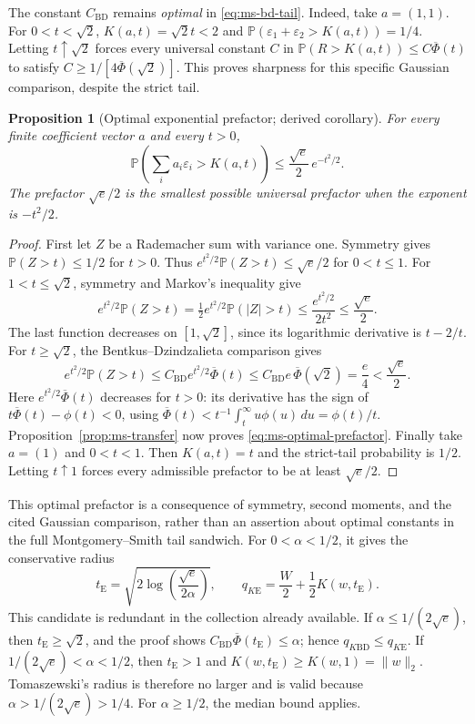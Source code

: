 \documentclass[11pt,letterpaper]{article}
\numberwithin{equation}{section}
\newtheorem{proposition}[theorem]{Proposition}
\theoremstyle{definition}
\theoremstyle{remark}
\begin{document}
The constant $C_{\mathrm{BD}}$ remains \emph{optimal} in
\eqref{eq:ms-bd-tail}. Indeed, take $a=(1,1)$. For $0<t<\sqrt2$,
$K(a,t)=\sqrt2t<2$ and
$\mathbb P(\varepsilon_1+\varepsilon_2>K(a,t))=1/4$.
Letting $t\uparrow\sqrt2$ forces every universal constant $C$ in
$\mathbb P(R>K(a,t))\le C\overline\Phi(t)$ to satisfy
$C\ge1/[4\overline\Phi(\sqrt2)]$. This proves sharpness for this
specific Gaussian comparison, despite the strict tail.

\begin{proposition}[Optimal exponential prefactor; derived corollary]
\label{prop:ms-optimal-prefactor}
For every finite coefficient vector $a$ and every $t>0$,
\begin{equation}
 \mathbb P\left(\sum_i a_i\varepsilon_i>K(a,t)\right)
 \le \frac{\sqrt e}{2}\,e^{-t^2/2}.
 \label{eq:ms-optimal-prefactor}
\end{equation}
The prefactor $\sqrt e/2$ is the smallest possible universal prefactor
when the exponent is $-t^2/2$.
\end{proposition}
\begin{proof}
First let $Z$ be a Rademacher sum with variance one. Symmetry gives
$\mathbb P(Z>t)\le1/2$ for $t>0$. Thus
$e^{t^2/2}\mathbb P(Z>t)\le\sqrt e/2$ for $0<t\le1$.
For $1<t\le\sqrt2$, symmetry and Markov's inequality give
\[
 e^{t^2/2}\mathbb P(Z>t)
 =\tfrac12 e^{t^2/2}\mathbb P(|Z|>t)
 \le\frac{e^{t^2/2}}{2t^2}\le\frac{\sqrt e}{2}.
\]
The last function decreases on $[1,\sqrt2]$, since its logarithmic
derivative is $t-2/t$.
For $t\ge\sqrt2$, the Bentkus--Dzindzalieta comparison gives
\[
 e^{t^2/2}\mathbb P(Z>t)
 \le C_{\mathrm{BD}}e^{t^2/2}\overline\Phi(t)
 \le C_{\mathrm{BD}}e\,\overline\Phi(\sqrt2)
 =\frac e4<\frac{\sqrt e}{2}.
\]
Here $e^{t^2/2}\overline\Phi(t)$ decreases for $t>0$: its derivative has
the sign of $t\overline\Phi(t)-\phi(t)<0$, using
$\overline\Phi(t)<t^{-1}\int_t^\infty u\phi(u)\,du=\phi(t)/t$.
Proposition~\ref{prop:ms-transfer} now proves
\eqref{eq:ms-optimal-prefactor}. Finally take $a=(1)$ and $0<t<1$.
Then $K(a,t)=t$ and the strict-tail probability is $1/2$.
Letting $t\uparrow1$ forces every admissible prefactor to be at least
$\sqrt e/2$.
\end{proof}

This optimal prefactor is a consequence of symmetry, second moments, and
the cited Gaussian comparison, rather than an assertion about optimal
constants in the full Montgomery--Smith tail sandwich. For
$0<\alpha<1/2$, it gives the conservative radius
\[
 t_{\mathrm E}=\sqrt{2\log\!\left(\frac{\sqrt e}{2\alpha}\right)},
 \qquad q_{K\mathrm E}=\frac W2+\frac12K(w,t_{\mathrm E}).
\]
This candidate is redundant in the collection already available.
If $\alpha\le1/(2\sqrt e)$, then $t_{\mathrm E}\ge\sqrt2$, and the proof
shows $C_{\mathrm{BD}}\overline\Phi(t_{\mathrm E})\le\alpha$; hence
$q_{K\mathrm{BD}}\le q_{K\mathrm E}$.
If $1/(2\sqrt e)<\alpha<1/2$, then $t_{\mathrm E}>1$ and
$K(w,t_{\mathrm E})\ge K(w,1)=\|w\|_2$.
Tomaszewski's radius is therefore no larger and is valid because
$\alpha>1/(2\sqrt e)>1/4$. For $\alpha\ge1/2$, the median bound applies.
\end{document}
